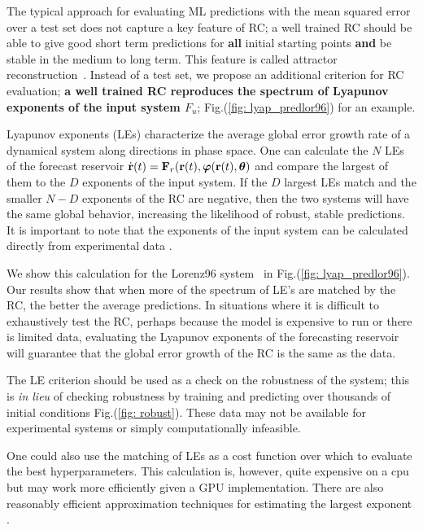 \documentclass[12pt]{article}
\begin{document}
The typical approach for evaluating ML predictions with the mean squared error over a test set does not capture a key feature of RC; a well trained RC should be able to give good short term predictions for {\bf all} initial starting points {\bf and} be stable in the medium to long term. This feature is called attractor reconstruction~\cite{hunt19}.  Instead of a test set, we propose an additional criterion for RC evaluation; {\bf a well trained RC reproduces the spectrum of Lyapunov exponents of the input system $F_u$}; Fig.(\ref{fig: lyap_predlor96}) for an example.

Lyapunov exponents (LEs) characterize the average global error growth rate of a dynamical system \cite{Lyapunov} along directions in phase space.  One can calculate the $N$ LEs of the forecast 
reservoir $\dot{\mbox{{\bf r}}}(t) = \mbox{$\bf{F}$}_r(\mbox{{\bf r}}(t), \mbox{$\boldsymbol{\varphi}$}(\mbox{{\bf r}}(t),\mbox{$\boldsymbol{\theta}$})$ and compare the largest of them to the $D$ exponents of the input system. If the $D$ largest LEs match and the smaller $N-D$ exponents of the RC are negative, then the two systems will have the same global behavior, increasing the likelihood of robust, stable predictions.  It is important to note that the exponents of the input system can be calculated directly from experimental data \cite{abar96}.

We show this calculation for the Lorenz96 system~\cite{lor96} in Fig.(\ref{fig: lyap_predlor96}). Our results show that when more of the spectrum of LE's are matched by the RC, the better the average predictions. In situations where it is difficult to exhaustively test the RC, perhaps because the model is expensive to run or there is limited data, evaluating the Lyapunov exponents of the forecasting reservoir will guarantee that the global error growth of the RC is the same as the data.  


The LE criterion should be used as a check on the robustness of the system; this is {\it in lieu} of checking robustness by training and predicting over thousands of initial conditions Fig.(\ref{fig: robust}). These data may not be available for experimental systems or simply computationally infeasible.

One could also use the matching of LEs as a cost function over which to evaluate the best hyperparameters. This calculation is, however, quite expensive on a cpu but may work more efficiently given a GPU implementation.  There are also reasonably efficient approximation techniques for estimating the largest exponent \cite{Rosenstein93}.
\end{document}
